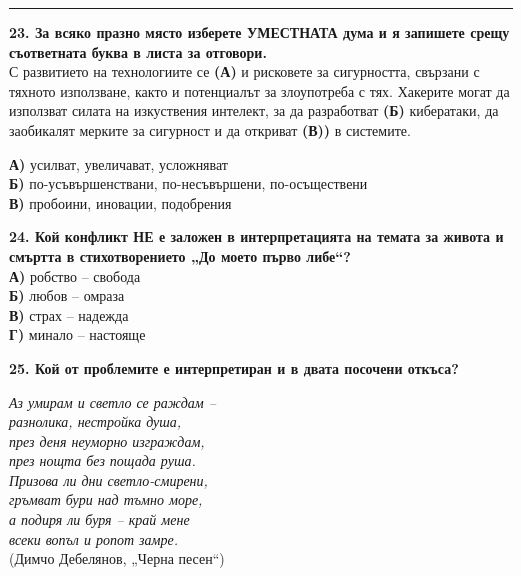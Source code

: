 \documentclass[12pt,a4paper]{article}
\begin{document}
\vspace{0.2cm}
\noindent\rule{\linewidth}{0.4pt}

\vspace{0.6cm}

\noindent
\textbf{23. За всяко празно място изберете УМЕСТНАТА дума и я запишете срещу съответната буква в листа за отговори.}\\
С развитието на технологиите се \underline{\hspace{3cm}} \textbf{(А)} и рисковете за сигурността, свързани с тяхното използване, както и потенциалът за злоупотреба с тях. Хакерите могат да използват силата на изкуствения интелект, за да разработват \underline{\hspace{3cm}} \textbf{(Б)} кибератаки, да заобикалят мерките за сигурност и да откриват \underline{\hspace{3cm}} \textbf{(В))} в системите.

\vspace{0.2cm}

\noindent
\textbf{А)} усилват, увеличават, усложняват\\
\textbf{Б)} по-усъвършенствани, по-несъвършени, по-осъществени\\
\textbf{В)} пробоини, иновации, подобрения\\
\vspace{0.2cm}

\noindent
\textbf{24. Кой конфликт НЕ е заложен в интерпретацията на темата за живота и смъртта в стихотворението „До моето първо либе“?}\\
\textbf{А)} робство -- свобода\\
\textbf{Б)} любов -- омраза\\
\textbf{В)} страх -- надежда\\
\textbf{Г)} минало -- настояще

\vspace{0.6cm}

\noindent
\textbf{25. Кой от проблемите е интерпретиран и в двата посочени откъса?}\\

\vspace{-0.3cm}

\noindent
\textit{Аз умирам и светло се раждам --\\
разнолика, нестройка душа,\\
през деня неуморно изграждам,\\
през нощта без пощада руша.
}
\vspace{0.3cm}
\\
\noindent
\textit{Призова ли дни светло-смирени,\\
гръмват бури над тъмно море,\\
а подиря ли буря -- край мене\\
всеки вопъл и ропот замре.} \\
\quad (Димчо Дебелянов, „Черна песен“)
\end{document}
